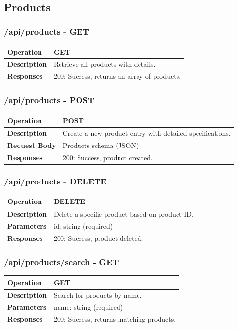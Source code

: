 \subsection{Products}

\subsubsection*{/api/products - GET}
\begin{tabular}{|>{\raggedright\arraybackslash}p{3cm}|p{12cm}|}
\hline
\textbf{Operation} & GET \\
\hline
\textbf{Description} & Retrieve all products with details. \\
\hline
\textbf{Responses} & 200: Success, returns an array of products. \\
\hline
\end{tabular}

\subsubsection*{/api/products - POST}
\begin{tabular}{|>{\raggedright\arraybackslash}p{3cm}|p{12cm}|}
\hline
\textbf{Operation} & POST \\
\hline
\textbf{Description} & Create a new product entry with detailed specifications. \\
\hline
\textbf{Request Body} & Products schema (JSON) \\
\hline
\textbf{Responses} & 200: Success, product created. \\
\hline
\end{tabular}

\subsubsection*{/api/products - DELETE}
\begin{tabular}{|>{\raggedright\arraybackslash}p{3cm}|p{12cm}|}
\hline
\textbf{Operation} & DELETE \\
\hline
\textbf{Description} & Delete a specific product based on product ID. \\
\hline
\textbf{Parameters} & id: string (required) \\
\hline
\textbf{Responses} & 200: Success, product deleted. \\
\hline
\end{tabular}

\subsubsection*{/api/products/search - GET}
\begin{tabular}{|>{\raggedright\arraybackslash}p{3cm}|p{12cm}|}
\hline
\textbf{Operation} & GET \\
\hline
\textbf{Description} & Search for products by name. \\
\hline
\textbf{Parameters} & name: string (required) \\
\hline
\textbf{Responses} & 200: Success, returns matching products. \\
\hline
\end{tabular}

